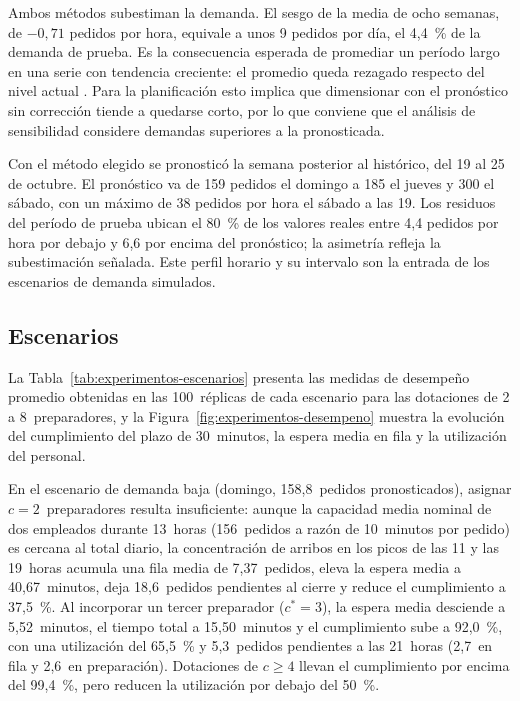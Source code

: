 Ambos métodos subestiman la demanda.
El sesgo de la media de ocho semanas, de $-0{,}71$ pedidos por hora, equivale a unos 9 pedidos por día, el 4,4~\% de la demanda de prueba.
Es la consecuencia esperada de promediar un período largo en una serie con tendencia creciente: el promedio queda rezagado respecto del nivel actual \cite{taha_io_2004}.
Para la planificación esto implica que dimensionar con el pronóstico sin corrección tiende a quedarse corto, por lo que conviene que el análisis de sensibilidad considere demandas superiores a la pronosticada.

Con el método elegido se pronosticó la semana posterior al histórico, del 19 al 25 de octubre.
El pronóstico va de 159 pedidos el domingo a 185 el jueves y 300 el sábado, con un máximo de 38 pedidos por hora el sábado a las 19.
Los residuos del período de prueba ubican el 80~\% de los valores reales entre 4,4 pedidos por hora por debajo y 6,6 por encima del pronóstico; la asimetría refleja la subestimación señalada.
Este perfil horario y su intervalo son la entrada de los escenarios de demanda simulados.

\subsection{Escenarios}
\label{sec:resultados-escenarios}

La Tabla~\ref{tab:experimentos-escenarios} presenta las medidas de desempeño promedio obtenidas en las 100~réplicas de cada escenario para las dotaciones de 2 a 8~preparadores, y la Figura~\ref{fig:experimentos-desempeno} muestra la evolución del cumplimiento del plazo de 30~minutos, la espera media en fila y la utilización del personal.

\begin{table}[htbp]
  \centering
  \caption{Desempeño medio en 100~réplicas por escenario y dotación ($c^*$ indica la menor dotación que alcanza al menos el 90~\% de pedidos listos en 30~minutos).}
  \label{tab:experimentos-escenarios}
  
\end{table}

En el escenario de demanda baja (domingo, 158,8~pedidos pronosticados), asignar $c = 2$~preparadores resulta insuficiente: aunque la capacidad media nominal de dos empleados durante 13~horas (156~pedidos a razón de 10~minutos por pedido) es cercana al total diario, la concentración de arribos en los picos de las 11 y las 19~horas acumula una fila media de 7,37~pedidos, eleva la espera media a 40,67~minutos, deja 18,6~pedidos pendientes al cierre y reduce el cumplimiento a 37,5~\%.
Al incorporar un tercer preparador ($c^* = 3$), la espera media desciende a 5,52~minutos, el tiempo total a 15,50~minutos y el cumplimiento sube a 92,0~\%, con una utilización del 65,5~\% y 5,3~pedidos pendientes a las 21~horas (2,7~en fila y 2,6~en preparación).
Dotaciones de $c \ge 4$ llevan el cumplimiento por encima del 99,4~\%, pero reducen la utilización por debajo del 50~\%.

